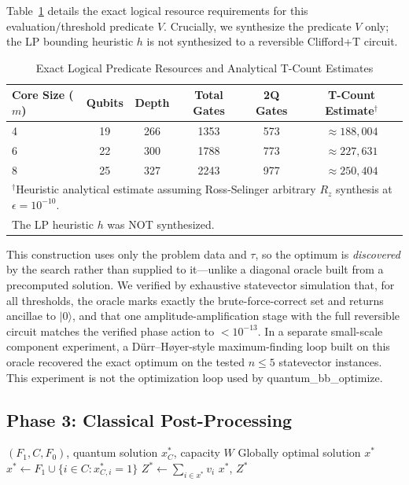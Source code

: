\documentclass[conference]{IEEEtran} \IEEEoverridecommandlockouts
\begin{document}
Table~\ref{tab:oracle} details the exact logical resource requirements for this evaluation/threshold predicate $V$. Crucially, we synthesize the predicate $V$ only; the LP bounding heuristic $h$ is not synthesized to a reversible Clifford+T circuit. 

\begin{table}[htbp]
\caption{Exact Logical Predicate Resources and Analytical T-Count Estimates}
\label{tab:oracle}
\begin{center}
\footnotesize
\begin{tabular}{lccccc}
\toprule
\textbf{Core Size ($m$)} & \textbf{Qubits} & \textbf{Depth} & \textbf{Total Gates} & \textbf{2Q Gates} & \textbf{T-Count Estimate$^\dagger$} \\
\midrule
4 & 19 & 266 & 1353 & 573 & $\approx 188{,}004$ \\
6 & 22 & 300 & 1788 & 773 & $\approx 227{,}631$ \\
8 & 25 & 327 & 2243 & 977 & $\approx 250{,}404$ \\
\bottomrule
\multicolumn{6}{l}{\footnotesize $^\dagger$Heuristic analytical estimate assuming Ross-Selinger arbitrary $R_z$ synthesis at $\epsilon = 10^{-10}$.} \\
\multicolumn{6}{l}{\footnotesize The LP heuristic $h$ was NOT synthesized.}
\end{tabular}
\end{center}
\end{table}

This construction uses only the problem data and $\tau$, so the optimum is \textit{discovered} by the search rather than supplied to it---unlike a diagonal oracle built from a precomputed solution. We verified by exhaustive statevector simulation that, for all thresholds, the oracle marks exactly the brute-force-correct set and returns ancillae to $|0\rangle$, and that one amplitude-amplification stage with the full reversible circuit matches the verified phase action to $<10^{-13}$. In a separate small-scale component experiment, a D\"urr--H{\o}yer-style maximum-finding loop built on this oracle recovered the exact optimum on the tested $n \le 5$ statevector instances. This experiment is not the optimization loop used by quantum\_bb\_optimize.

\subsection{Phase 3: Classical Post-Processing}

\begin{algorithm}[h]
\caption{Classical Reconstruction}
\label{alg:postprocess}
\begin{algorithmic}[1]
\REQUIRE $(F_1, C, F_0)$, quantum solution $x^*_C$, capacity $W$
\ENSURE Globally optimal solution $x^*$
\STATE $x^* \leftarrow F_1 \cup \{i \in C : x^*_{C,i} = 1\}$
\STATE $Z^* \leftarrow \sum_{i \in x^*} v_i$
\RETURN $x^*$, $Z^*$
\end{algorithmic}
\end{algorithm}
\end{document}
